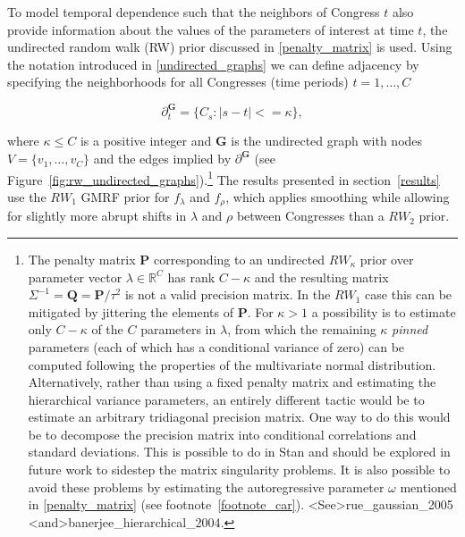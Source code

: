 To model temporal dependence such that the neighbors of Congress $t$ also provide information about the values of the parameters of interest at time $t$, the undirected random walk (RW) prior discussed in \ref{penalty_matrix} is used. Using the notation introduced in \ref{undirected_graphs} we can define adjacency by specifying the neighborhoods for all Congresses (time periods) $t = 1, \dots, C$

\begin{equation*}
\partial^\mathbf{G}_t = \{C_s : \left| s - t \right| <= \kappa \},
\end{equation*}

\noindent where $\kappa \leq C$ is a positive integer and $\mathbf{G}$ is the undirected graph with nodes $V = \{v_1, \dots, v_C\}$ and the edges implied by $\partial^\mathbf{G}$ (see Figure~\ref{fig:rw_undirected_graphs}).\footnote{The penalty matrix $\mathbf{P}$ corresponding to an undirected $RW_\kappa$ prior over parameter vector $\lambda \in \mathbb{R}^C$ has rank $C - \kappa$ and the resulting matrix $\Sigma^{-1} = \mathbf{Q} = \mathbf{P}/\tau^2$ is not a valid precision matrix. In the $RW_1$ case this can be mitigated by jittering the elements of $\mathbf{P}$. For $\kappa > 1$ a possibility is to estimate only $C - \kappa$ of the $C$ parameters in $\lambda$,  from which the remaining $\kappa$ {\it pinned} parameters (each of which has a conditional variance of zero) can be computed following the properties of the multivariate normal distribution. Alternatively, rather than using a fixed penalty matrix and estimating the hierarchical variance parameters, an entirely different tactic would be to estimate an arbitrary tridiagonal precision matrix. One way to do this would be to decompose the precision matrix into conditional correlations and standard deviations. This is possible to do in Stan and should be explored in future work to sidestep the matrix singularity problems. It is also possible to avoid these problems by estimating the autoregressive parameter $\omega$ mentioned in \ref{penalty_matrix} (see footnote~\ref{footnote_car}). \citeA<See>{rue_gaussian_2005} \citeA<and>{banerjee_hierarchical_2004}.} The results presented in section~\ref{results} use the $RW_1$ GMRF prior for $f_\lambda$ and $f_\rho$, which applies smoothing while allowing for slightly more abrupt shifts in $\lambda$ and $\rho$ between Congresses than a $RW_2$ prior. 


